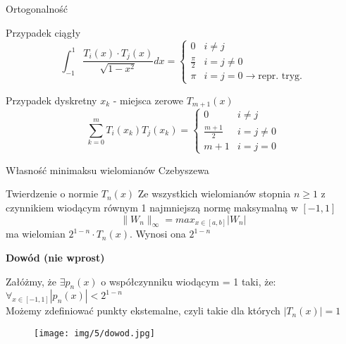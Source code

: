 \begin{frame}{Ortogonalność}
	\begin{block}{Przypadek ciągły}
		$$\int_{-1}^{1}\frac{T_i(x) \cdot T_j(x)}{\sqrt{1-x^2}}dx = \left\{\begin{array}{lc}
			0 & i \not= j \\
            \frac{\pi}{2} & i = j \not= 0 \\
            \pi & i = j = 0 \rightarrow \text{repr. tryg.}
		\end{array}\right.$$
	\end{block}
    
    \begin{block}{Przypadek dyskretny $x_k$ - miejsca zerowe $T_{m+1}(x)$}
    $$\sum_{k=0}^{m}T_i(x_k)T_j(x_k) = \left\{\begin{array}{rc}
    	0 & i \not= j \\
        \frac{m+1}{2} & i=j \not= 0 \\
        m+1 & i=j=0
    \end{array}\right.$$
    \end{block}
\end{frame}
\begin{frame}{Własność minimaksu wielomianów Czebyszewa}
	\begin{block}{Twierdzenie o normie $T_n(x)$}
		Ze wszystkich wielomianów stopnia $n\geqslant1$ z czynnikiem wiodącym równym 1 najmniejszą normę maksymalną w $[-1,1]$
        $$\lVert W_n \rVert _{\infty} = max_{x \in [a,b]}|W_n|$$
        ma wielomian $2^{1-n} \cdot T_n(x)$. Wynosi ona $2^{1-n}$
	\end{block}
\end{frame}
\begin{frame}
	\textbf{Dowód (nie wprost) }\newline
	
		Załóżmy, że $\exists p_n(x)$ o współczynniku wiodącym = 1 taki, że:
      \\$\forall_{x \in [-1,1]}|p_n(x)| < 2^{1-n}$\\
      Możemy zdefiniować punkty ekstemalne, czyli takie dla których $|T_n(x)|=1$
    \begin{figure}
		\texttt{[image: img/5/dowod.jpg]}
	\end{figure}
\end{frame}

